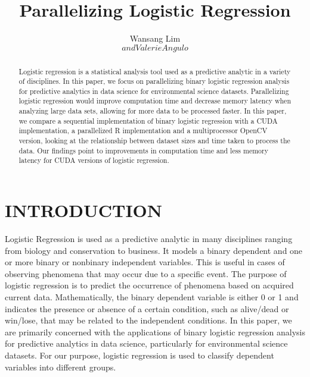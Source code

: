 \documentclass[letterpaper, 10 pt, conference]{ieeeconf}  %
\title{\LARGE \bf
Parallelizing Logistic Regression
}
\author{Wansang Lim$$ and Valerie Angulo$$%
}
\begin{document}
\maketitle
\thispagestyle{empty}
\pagestyle{empty}


\begin{abstract}
  Logistic regression is a statistical analysis tool used as a predictive analytic in a variety of disciplines. In this paper, we focus on parallelizing binary logistic regression analysis for predictive analytics in data science for environmental science datasets. Parallelizing logistic regression would improve computation time and decrease memory latency when analyzing large data sets, allowing for more data to be processed faster. In this paper, we compare a sequential implementation of binary logistic regression with a CUDA implementation, a parallelized R implementation and a multiprocessor OpenCV version, looking at the relationship between dataset sizes and time taken to process the data. Our findings point to improvements in computation time and less memory latency for CUDA versions of logistic regression.

\end{abstract}


\section{INTRODUCTION}

Logistic Regression is used as a predictive analytic in many disciplines ranging from biology and conservation to business. It models a binary dependent and one or more binary or nonbinary independent variables. This is useful in cases of observing phenomena that may occur due to a specific event. The purpose of logistic regression is to predict the occurrence of phenomena based on acquired current data. Mathematically, the binary dependent variable is either 0 or 1 and indicates the presence or absence of a certain condition, such as alive/dead or win/lose, that may be related to the independent conditions. In this paper, we are primarily concerned with the applications of binary logistic regression analysis for predictive analytics in data science, particularly for environmental science datasets. For our purpose, logistic regression is used to classify dependent variables into different groups. 
\end{document}
